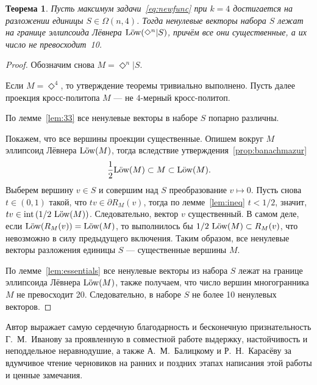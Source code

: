 \documentclass[a4paper,12pt]{article}
\def\int{\mathop{\rm int}}
\def\low{\text{\rm L\"ow}}
\newcommand{\crosp}{\Diamond}
\newtheorem{theorem}{Теорема}[section]
\numberwithin{equation}{section}
\begin{document}
	\begin{theorem}
		Пусть максимум задачи~\eqref{eq:newfunc} при $k=4$ достигается на разложении единицы $S\in\Omega(n,4)$. Тогда ненулевые векторы набора $S$ лежат на границе эллипсоида Лёвнера $\low(\crosp^n|S)$, причём все они существенные, а их число не превосходит~10.
	\end{theorem}
	\begin{proof}
		Обозначим снова $M=\crosp^n|S$. 

		Если $M=\crosp^4$, то утверждение теоремы тривиально выполнено. Пусть далее проекция кросс-политопа $M$ --- не $4$-мерный кросс-политоп.

		По лемме~\ref{lem:33} все ненулевые векторы в наборе $S$ попарно различны.

		Покажем, что все вершины проекции существенные. Опишем вокруг $M$ эллипсоид Лёвнера $\low(M)$, тогда вследствие утверждения~\ref{prop:banachmazur}
			$$\frac{1}{2}\low (M)\subset M\subset\low (M).$$
		Выберем вершину $v\in S$ и совершим над $S$ преобразование $v\mapsto 0$. Пусть снова $t\in(0,1)$ такой, что $tv\in\partial R_M(v)$, тогда по лемме~\ref{lem:ineq} $t<1/2$, значит, $tv\in\int\left(1/2\ \low(M)\right)$. Следовательно, вектор $v$ существенный. В самом деле, если $\low(R_M(v))=\low(M)$, то выполнилось бы $1/2\ \low(M)\subset R_M(v)$, что невозможно в силу предыдущего включения. Таким образом, все ненулевые векторы разложения единицы $S$ --- существенные вершины $M$.
	
		По лемме~\ref{lem:essentials} все ненулевые векторы из набора $S$ лежат на границе эллипсоида Лёвнера $\low(M)$, также получаем, что число вершин многогранника $M$ не превосходит 20. Следовательно, в наборе $S$ не более 10 ненулевых векторов.
	\end{proof}
	\vspace{1cm}

	\begin{center}
	Автор выражает самую сердечную благодарность и бесконечную признательность Г.~М.~Иванову за проявленную в совместной работе выдержку, настойчивость и неподдельное неравнодушие, а также А.~М.~Балицкому и Р.~Н.~Карасёву за вдумчивое чтение черновиков на ранних и поздних этапах написания этой работы и ценные замечания.
	\end{center}


{}
\end{document}
